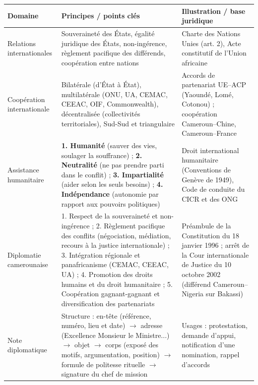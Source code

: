 \documentclass[11pt]{article}
\begin{document}
\begin{center}
\begin{tabularx}{\linewidth}{|l|X|X|}
\hline
\rowcolor{popblueL}
\textbf{Domaine} & \textbf{Principes / points clés} & \textbf{Illustration / base juridique} \\
\hline
Relations internationales & Souveraineté des États, égalité juridique des États, non-ingérence, règlement pacifique des différends, coopération entre nations & Charte des Nations Unies (art. 2), Acte constitutif de l'Union africaine \\
\hline
Coopération internationale & Bilatérale (d'État à État), multilatérale (ONU, UA, CEMAC, CEEAC, OIF, Commonwealth), décentralisée (collectivités territoriales), Sud-Sud et triangulaire & Accords de partenariat UE--ACP (Yaoundé, Lomé, Cotonou) ; coopération Cameroun--Chine, Cameroun--France \\
\hline
Assistance humanitaire & \textbf{1. Humanité} (sauver des vies, soulager la souffrance) ; \textbf{2. Neutralité} (ne pas prendre parti dans le conflit) ; \textbf{3. Impartialité} (aider selon les seuls besoins) ; \textbf{4. Indépendance} (autonomie par rapport aux pouvoirs politiques) & Droit international humanitaire (Conventions de Genève de 1949), Code de conduite du CICR et des ONG \\
\hline
Diplomatie camerounaise & 1. Respect de la souveraineté et non-ingérence ; 2. Règlement pacifique des conflits (négociation, médiation, recours à la justice internationale) ; 3. Intégration régionale et panafricanisme (CEMAC, CEEAC, UA) ; 4. Promotion des droits humains et du droit humanitaire ; 5. Coopération gagnant-gagnant et diversification des partenariats & Préambule de la Constitution du 18 janvier 1996 ; arrêt de la Cour internationale de Justice du 10 octobre 2002 (différend Cameroun--Nigeria sur Bakassi) \\
\hline
Note diplomatique & Structure : en-tête (référence, numéro, lieu et date) $\to$ adresse (Excellence Monsieur le Ministre...) $\to$ objet $\to$ corps (exposé des motifs, argumentation, position) $\to$ formule de politesse rituelle $\to$ signature du chef de mission & Usages : protestation, demande d'appui, notification d'une nomination, rappel d'accords \\
\hline
\end{tabularx}
\end{center}
\end{document}
